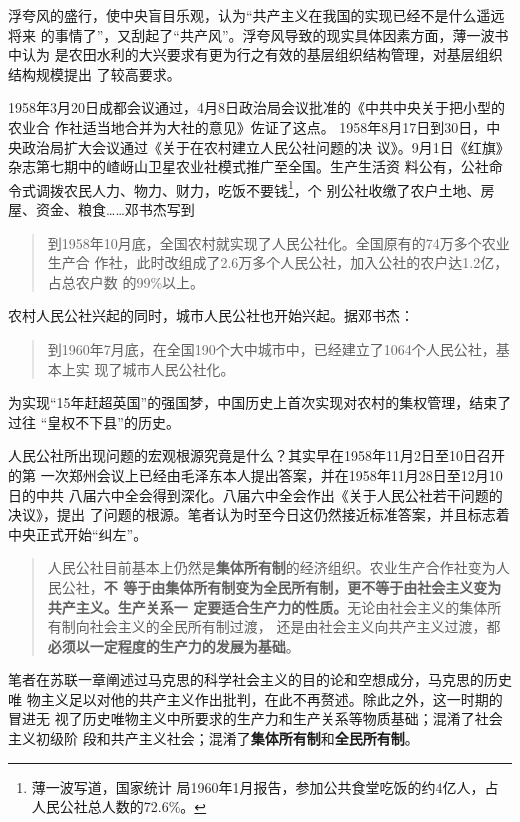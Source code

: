 浮夸风的盛行，使中央盲目乐观，认为“共产主义在我国的实现已经不是什么遥远将来
的事情了”，又刮起了“共产风”。浮夸风导致的现实具体因素方面，薄一波书中认为
是农田水利的大兴要求有更为行之有效的基层组织结构管理，对基层组织结构规模提出
了较高要求。

1958年3月20日成都会议通过，4月8日政治局会议批准的《中共中央关于把小型的农业合
作社适当地合并为大社的意见》佐证了这点。
1958年8月17日到30日，中央政治局扩大会议通过《关于在农村建立人民公社问题的决
议》。9月1日《红旗》杂志第七期中的嵖岈山卫星农业社模式推广至全国。生产生活资
料公有，公社命令式调拨农民人力、物力、财力，吃饭不要钱\footnote{薄一波写道，国家统计
  局1960年1月报告，参加公共食堂吃饭的约4亿人，占人民公社总人数的72.6\%。}，个
别公社收缴了农户土地、房屋、资金、粮食……邓书杰写到
\begin{quotation}
  到1958年10月底，全国农村就实现了人民公社化。全国原有的74万多个农业生产合
  作社，此时改组成了2.6万多个人民公社，加入公社的农户达1.2亿，占总农户数
  的99\%以上。
\end{quotation}

农村人民公社兴起的同时，城市人民公社也开始兴起。据邓书杰：
\begin{quotation}
  到1960年7月底，在全国190个大中城市中，已经建立了1064个人民公社，基本上实
  现了城市人民公社化。
\end{quotation}

为实现“15年赶超英国”的强国梦，中国历史上首次实现对农村的集权管理，结束了过往
“皇权不下县”的历史。

人民公社所出现问题的宏观根源究竟是什么？其实早在1958年11月2日至10日召开的第
一次郑州会议上已经由毛泽东本人提出答案，并在1958年11月28日至12月10日的中共
八届六中全会得到深化。八届六中全会作出《关于人民公社若干问题的决议》，提出
了问题的根源。笔者认为时至今日这仍然接近标准答案，并且标志着中央正式开始“纠左”。
\begin{quotation}
  人民公社目前基本上仍然是\textbf{集体所有制}的经济组织。农业生产合作社变为人民公社，\textbf{不
  等于由集体所有制变为全民所有制，更不等于由社会主义变为共产主义。生产关系一
  定要适合生产力的性质。}无论由社会主义的集体所有制向社会主义的全民所有制过渡，
  还是由社会主义向共产主义过渡，都\textbf{必须以一定程度的生产力的发展为基础}。
\end{quotation}

笔者在苏联一章阐述过马克思的科学社会主义的目的论和空想成分，马克思的历史唯
物主义足以对他的共产主义作出批判，在此不再赘述。除此之外，这一时期的冒进无
视了历史唯物主义中所要求的生产力和生产关系等物质基础；混淆了社会主义初级阶
段和共产主义社会；混淆了\textbf{集体所有制}和\textbf{全民所有制}。

